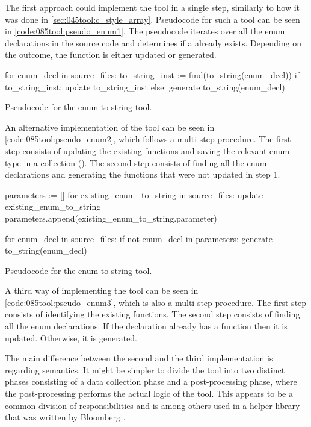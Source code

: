 The first approach could implement the tool in a single step, similarly to how it was done in \cref{sec:045tool:c_style_array}. Pseudocode for such a tool can be seen in \cref{code:085tool:pseudo_enum1}. The pseudocode iterates over all the enum declarations in the source code and determines if a  already exists. Depending on the outcome, the function is either updated or generated.

\begin{listing}[H]
    \begin{pythoncode}
for enum_decl in source_files:
    to_string_inst := find(to_string(enum_decl))
    if to_string_inst:
        update to_string_inst
    else:
        generate to_string(enum_decl)
    \end{pythoncode}
    \caption{Pseudocode for the enum-to-string tool.}
    \label{code:085tool:pseudo_enum1}
\end{listing}

An alternative implementation of the tool can be seen in \cref{code:085tool:pseudo_enum2}, which follows a multi-step procedure. The first step consists of updating the existing  functions and saving the relevant enum type in a collection (). The second step consists of finding all the enum declarations and generating the  functions that were not updated in step 1.

\begin{listing}[H]
    \begin{pythoncode}
parameters := []
for existing_enum_to_string in source_files:
    update existing_enum_to_string
    parameters.append(existing_enum_to_string.parameter)

for enum_decl in source_files:
    if not enum_decl in parameters:
        generate to_string(enum_decl)
    \end{pythoncode}
    \caption{Pseudocode for the enum-to-string tool.}
    \label{code:085tool:pseudo_enum2}
\end{listing}

A third way of implementing the tool can be seen in \cref{code:085tool:pseudo_enum3}, which is also a multi-step procedure. The first step consists of identifying the existing  functions. The second step consists of finding all the enum declarations. If the declaration already has a  function then it is updated. Otherwise, it is generated.

The main difference between the second and the third implementation is regarding semantics. It might be simpler to divide the tool into two distinct phases consisting of a data collection phase and a post-processing phase, where the post-processing performs the actual logic of the tool. This appears to be a common division of responsibilities and is among others used in a helper library that was written by Bloomberg \cite{ClangmetatoolFrameworkReusing2023}.

